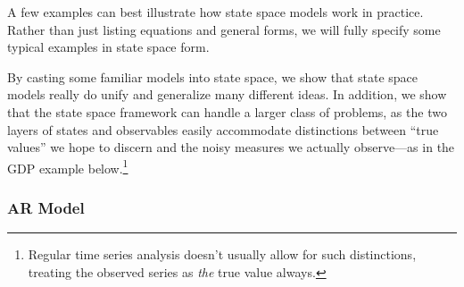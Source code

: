 \documentclass[a4paper,12pt]{article}
\begin{document}
A few examples can best illustrate how state space models work in practice. Rather than just listing equations and general forms, we will fully specify some typical examples in state space form.

By casting some familiar models into state space, we show that state space models really do unify and generalize many different ideas. In addition, we show that the state space framework can handle a larger class of problems, as the two layers of states and observables easily accommodate distinctions between ``true values'' we hope to discern and the noisy measures we actually observe---as in the GDP example below.\footnote{Regular time series analysis doesn't usually allow for such distinctions, treating the observed series as \emph{the} true value always.}

\subsubsection{AR Model}
\end{document}
